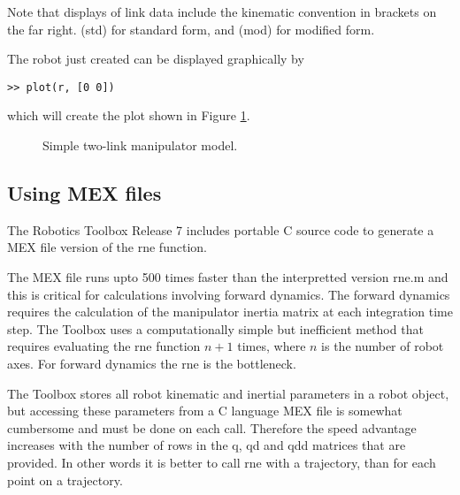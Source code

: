 \documentclass{article}
\newcommand{\var}[1]{{\vtt #1}}
\begin{document}
Note that displays of link data include the kinematic convention in
brackets on the far right.  \var{(std)} for standard form, and 
\var{(mod)} for modified form.

The robot just created can be displayed graphically by
\begin{verbatim}
>> plot(r, [0 0])
\end{verbatim}
which will create the plot shown in Figure \ref{fig:simple-plot}.

\begin{figure}
\caption{Simple two-link manipulator model.}\label{fig:simple-plot}
\end{figure}

\subsection{Using MEX files}\label{sec:mex}
The Robotics Toolbox Release 7 includes portable C source code to generate
a MEX file version of the \var{rne} function.

The MEX file runs upto 500
times faster than the interpretted version \var{rne.m} and this is critical
for calculations involving forward dynamics.
The forward dynamics requires the calculation of the manipulator inertia
matrix at each integration time step.  The Toolbox uses a computationally
simple but inefficient method that requires evaluating the \var{rne}
function $n+1$ times, where $n$ is the number of robot axes.  For forward
dynamics the \var{rne} is the bottleneck.

The Toolbox stores all robot kinematic and inertial parameters in a
\var{robot} object, but accessing these parameters from a C language
MEX file is somewhat cumbersome and must be done on each call.  Therefore
the speed advantage increases with the number of rows in the \var{q},
\var{qd} and \var{qdd} matrices that are provided.  In other words
it is better to call \var{rne} with a trajectory, than for each point on
a trajectory.
\end{document}
